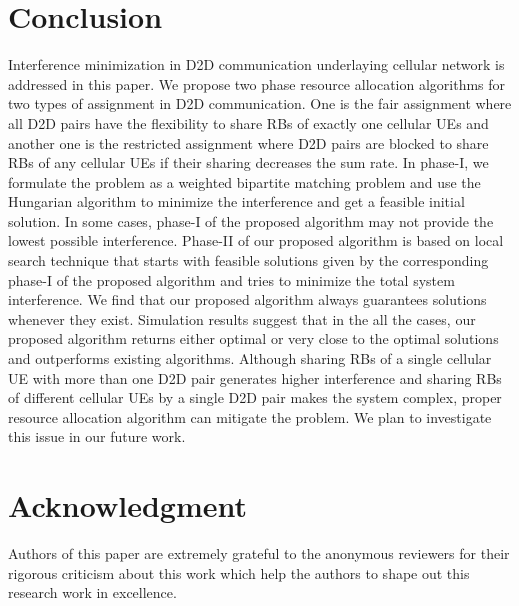 \documentclass{ieeeaccess}
\begin{document}
\section{Conclusion}\label{sec:conclusion}
\smallskip
 
Interference minimization in D2D communication underlaying cellular network is addressed in this paper. We propose two phase resource allocation algorithms for two types of assignment in D2D communication. One is the fair assignment where all D2D pairs have the flexibility to share RBs of exactly one cellular UEs and another one is the restricted assignment where D2D pairs are blocked to share RBs of any cellular UEs if their sharing decreases the sum rate. In phase-I, we formulate the problem as a weighted bipartite matching problem and use the Hungarian algorithm to minimize the interference and get a feasible initial solution. In some cases, phase-I of the proposed algorithm may not provide the lowest possible interference. Phase-II of our proposed algorithm is based on local search technique that starts with feasible solutions given by the corresponding phase-I of the proposed algorithm and tries to minimize the total system interference. We find that our proposed algorithm always guarantees solutions whenever they exist. Simulation results suggest that in the all the cases, our proposed algorithm returns either optimal or very close to the optimal solutions and outperforms existing algorithms. Although sharing RBs of a single cellular UE with more than one D2D pair generates higher interference and sharing RBs of different cellular UEs by a single D2D pair makes the system complex, proper resource allocation algorithm can mitigate the problem. We plan to investigate this issue in our future work.
 

\section*{Acknowledgment}
\smallskip

Authors of this paper are extremely grateful to the anonymous reviewers for their rigorous criticism about this work which help the authors to shape out this research work in excellence.
\end{document}
